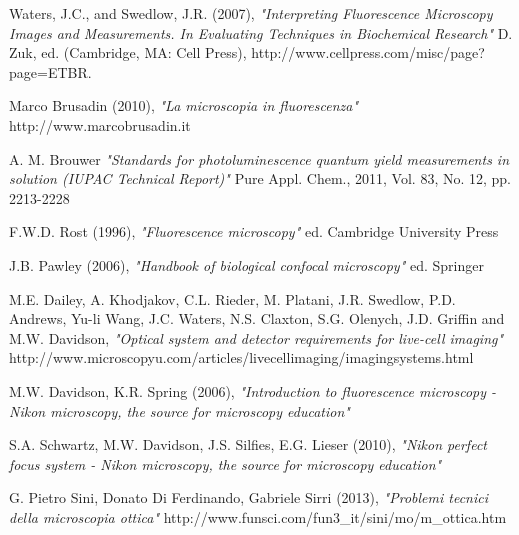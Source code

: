 \clearpage{\pagestyle{empty}\cleardoublepage}

\begin{thebibliography}{3}


 Waters, J.C., and Swedlow, J.R. (2007), \emph {"Interpreting Fluorescence Microscopy Images and Measurements. In Evaluating Techniques in Biochemical Research"} \newline D. Zuk, ed. (Cambridge, MA: Cell Press), \newline http://www.cellpress.com/misc/page?page=ETBR.

 Marco Brusadin (2010), \emph{"La microscopia in fluorescenza"} \newline  http://www.marcobrusadin.it

 A. M. Brouwer \emph{"Standards for photoluminescence quantum yield measurements in solution (IUPAC Technical Report)"} \newline Pure Appl. Chem., 2011, Vol. 83, No. 12, pp. 2213-2228

 F.W.D. Rost (1996), \emph{"Fluorescence microscopy"} \newline ed. Cambridge University Press

 J.B. Pawley (2006), \emph{"Handbook of biological confocal microscopy"} \newline ed. Springer

 M.E. Dailey, A. Khodjakov, C.L. Rieder, M. Platani, J.R. Swedlow, P.D. Andrews, Yu-li Wang, J.C. Waters, N.S. Claxton, S.G. Olenych, J.D. Griffin and M.W. Davidson, \emph{"Optical system and detector requirements for live-cell imaging"} \newline http://www.microscopyu.com/articles/livecellimaging/imagingsystems.html

 M.W. Davidson, K.R. Spring (2006), \emph{"Introduction to fluorescence microscopy - Nikon microscopy, the source for microscopy education"} 

 S.A. Schwartz, M.W. Davidson, J.S. Silfies, E.G. Lieser (2010), \emph{"Nikon perfect focus system - Nikon microscopy, the source for microscopy education"} 

 G. Pietro Sini, Donato Di Ferdinando, Gabriele Sirri (2013), \emph{"Problemi tecnici della microscopia ottica"} \newline http://www.funsci.com/fun3\_it/sini/mo/m\_ottica.htm


\end{thebibliography}

